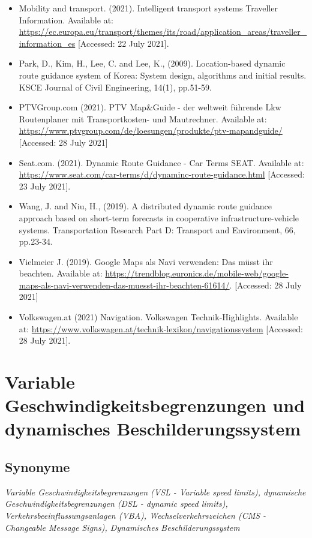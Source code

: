 \documentclass[
]{book}
\begin{document}
\begin{itemize}
\item
  Mobility and transport. (2021). Intelligent transport systems Traveller Information. Available at: \url{https://ec.europa.eu/transport/themes/its/road/application_areas/traveller_information_es} {[}Accessed: 22 July 2021{]}.
\item
  Park, D., Kim, H., Lee, C. and Lee, K., (2009). Location-based dynamic route guidance system of Korea: System design, algorithms and initial results. KSCE Journal of Civil Engineering, 14(1), pp.51-59.
\item
  PTVGroup.com (2021). PTV Map\&Guide - der weltweit führende Lkw Routenplaner mit Transportkosten- und Mautrechner. Available at: \url{https://www.ptvgroup.com/de/loesungen/produkte/ptv-mapandguide/} {[}Accessed: 28 July 2021{]}
\item
  Seat.com. (2021). Dynamic Route Guidance - Car Terms \textbar{} SEAT. Available at: \url{https://www.seat.com/car-terms/d/dynaminc-route-guidance.html} {[}Accessed: 23 July 2021{]}.
\item
  Wang, J. and Niu, H., (2019). A distributed dynamic route guidance approach based on short-term forecasts in cooperative infrastructure-vehicle systems. Transportation Research Part D: Transport and Environment, 66, pp.23-34.
\item
  Vielmeier J. (2019). Google Maps als Navi verwenden: Das müsst ihr beachten. Available at: \url{https://trendblog.euronics.de/mobile-web/google-maps-als-navi-verwenden-das-muesst-ihr-beachten-61614/}. {[}Accessed: 28 July 2021{]}
\item
  Volkswagen.at (2021) Navigation. Volkswagen Technik-Highlights. Available at: \url{https://www.volkswagen.at/technik-lexikon/navigationssystem} {[}Accessed: 28 July 2021{]}.
\end{itemize}

\hypertarget{variable_speed}{%
\section{Variable Geschwindigkeitsbegrenzungen und dynamisches Beschilderungssystem}\label{variable_speed}}

\hypertarget{synonyme-13}{%
\subsection*{Synonyme}\label{synonyme-13}}

\emph{Variable Geschwindigkeitsbegrenzungen (VSL - Variable speed limits), dynamische Geschwindigkeitsbegrenzungen (DSL - dynamic speed limits), Verkehrsbeeinflussungsanlagen (VBA), Wechselverkehrszeichen (CMS - Changeable Message Signs), Dynamisches Beschilderungssystem}
\end{document}
